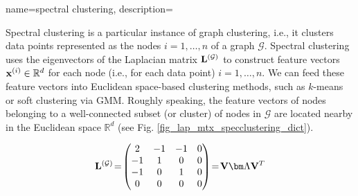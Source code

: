 {name={spectral clustering},
	description={Spectral clustering is a particular instance of 
		graph clustering, i.e., it clusters data points 
		represented as the nodes $i=1,\ldots,n$ of a graph $\mathcal{G}$. 
		Spectral clustering uses the eigenvectors of the Laplacian matrix ${\bf L}^{(\mathcal{G})}$ 
		to construct feature vectors ${\bf x}^{(i)} \in \mathbb{R}^{d}$ 
		for each node (i.e., for each data point) $i=1,\ldots,n$. We can feed these feature vectors 
		into Euclidean space-based clustering methods, such as $k$-means 
		or soft clustering via GMM. Roughly speaking, the feature vectors of nodes 
		belonging to a well-connected subset (or cluster) of nodes in $\mathcal{G}$ are located 
		nearby in the Euclidean space $\mathbb{R}^{d}$ (see Fig. \ref{fig_lap_mtx_specclustering_dict}). 
		\begin{figure}[H]
			\begin{center}
				\begin{minipage}{0.4\textwidth}
				\end{minipage} 
				\hspace*{5mm}
				\begin{minipage}{0.4\textwidth}
					\begin{equation} 
						{\bf L}^{(\mathcal{G})}\!=\!
						\begin{pmatrix} 
							2 & -1 & -1 & 0 \\ 
							-1 & 1 & 0 & 0 \\  
							-1 & 0 & 1 & 0 \\ 
							0 & 0 & 0 & 0 
						\end{pmatrix}\!=\!\mathbf{V} {\bm \Lambda} \mathbf{V}^{T}  
						\nonumber
					\end{equation} 
				\end{minipage}
				\vspace*{20mm}\\
				  \begin{minipage}{0.4\textwidth}
				\begin{tikzpicture}[scale=3]


\end{tikzpicture}
\end{minipage}
\end{center}
\end{figure}}}
